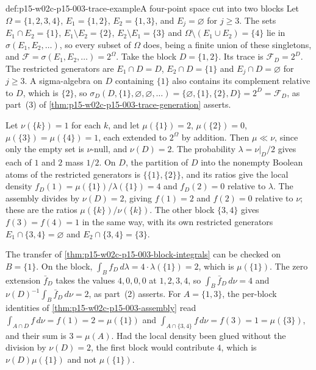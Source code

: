 \begin{hbexample}{def:p15-w02c-p15-003-trace-example}{A four-point space cut into two blocks}
Let \(\Omega=\{1,2,3,4\}\), \(E_1=\{1,2\}\), \(E_2=\{1,3\}\), and \(E_j=\varnothing\) for \(j\geq3\). The
sets \(E_1\cap E_2=\{1\}\), \(E_1\setminus E_2=\{2\}\),
\(E_2\setminus E_1=\{3\}\) and \(\Omega\setminus(E_1\cup E_2)=\{4\}\)
lie in \(\sigma(E_1,E_2,\ldots)\), so every subset of \(\Omega\) does, being a
finite union of these singletons, and
\(\mathcal F=\sigma(E_1,E_2,\ldots)=2^\Omega\). Take the block
\(D=\{1,2\}\). Its trace is \(\mathcal F_D=2^D\). The restricted
generators are \(E_1\cap D=D\), \(E_2\cap D=\{1\}\) and \(E_j\cap D=\varnothing\) for \(j\geq3\). A sigma-algebra
on \(D\) containing \(\{1\}\) also contains its complement relative to
\(D\), which is \(\{2\}\), so
\(\sigma_D(D,\{1\},\varnothing,\varnothing,\ldots)=\{\varnothing,\{1\},\{2\},D\}=2^D=\mathcal F_D\),
as part~(3) of \cref{thm:p15-w02c-p15-003-trace-generation} asserts.

Let \(\nu(\{k\})=1\) for each \(k\), and let \(\mu(\{1\})=2\),
\(\mu(\{2\})=0\), \(\mu(\{3\})=\mu(\{4\})=1\), each extended to
\(2^\Omega\) by addition. Then \(\mu\ll\nu\), since only the empty set is
\(\nu\)-null, and \(\nu(D)=2\). The probability \(\lambda=\nu|_D/2\)
gives each of \(1\) and \(2\) mass \(1/2\). On \(D\), the partition of
\(D\) into the nonempty Boolean atoms of the restricted generators is
\(\{\{1\},\{2\}\}\), and its ratios give the local density
\(f_D(1)=\mu(\{1\})/\lambda(\{1\})=4\) and \(f_D(2)=0\) relative to
\(\lambda\). The assembly divides by \(\nu(D)=2\), giving \(f(1)=2\) and
\(f(2)=0\) relative to \(\nu\); these are the ratios
\(\mu(\{k\})/\nu(\{k\})\). The other block \(\{3,4\}\) gives
\(f(3)=f(4)=1\) in the same way, with its own restricted generators
\(E_1\cap\{3,4\}=\varnothing\) and \(E_2\cap\{3,4\}=\{3\}\).

The transfer of \cref{thm:p15-w02c-p15-003-block-integrals} can be checked
on \(B=\{1\}\). On the block,
\(\int_Bf_D\,d\lambda=4\cdot\lambda(\{1\})=2\), which is \(\mu(\{1\})\).
The zero extension \(\bar f_D\) takes the values \(4,0,0,0\) at
\(1,2,3,4\), so \(\int_B\bar f_D\,d\nu=4\) and
\(\nu(D)^{-1}\int_B\bar f_D\,d\nu=2\), as part~(2) asserts. For
\(A=\{1,3\}\), the per-block identities of
\cref{thm:p15-w02c-p15-003-assembly} read
\(\int_{A\cap D}f\,d\nu=f(1)=2=\mu(\{1\})\) and
\(\int_{A\cap\{3,4\}}f\,d\nu=f(3)=1=\mu(\{3\})\), and their sum is
\(3=\mu(A)\). Had the local density been glued without the division by
\(\nu(D)=2\), the first block would contribute \(4\), which is
\(\nu(D)\mu(\{1\})\) and not \(\mu(\{1\})\).
\end{hbexample}

